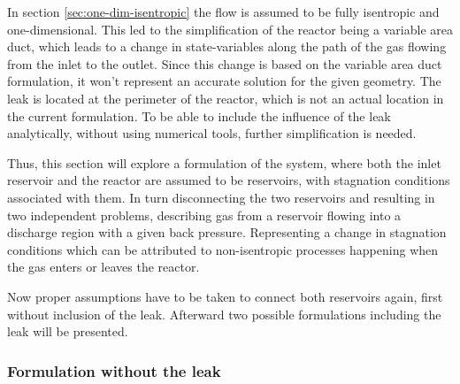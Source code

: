 In section \ref{sec:one-dim-isentropic} the flow is assumed to be fully isentropic and one-dimensional.
This led to the simplification of the reactor being a variable area duct, which leads to a change in state-variables along the path of the gas flowing from the inlet to the outlet.
Since this change is based on the variable area duct formulation, it won't represent an accurate solution for the given geometry.
The leak is located at the perimeter of the reactor, which is not an actual location in the current formulation.
To be able to include the influence of the leak analytically, without using numerical tools, further simplification is needed.

Thus, this section will explore a formulation of the system, where both the inlet reservoir and the reactor are assumed to be reservoirs, with stagnation conditions associated with them.
In turn disconnecting the two reservoirs and resulting in two independent problems, describing gas from a reservoir flowing into a discharge region with a given back pressure. 
Representing a change in stagnation conditions which can be attributed to non-isentropic processes happening when the gas enters or leaves the reactor.

Now proper assumptions have to be taken to connect both reservoirs again, first without inclusion of the leak.
Afterward two possible formulations including the leak will be presented.

\subsubsection*{Formulation without the leak}

